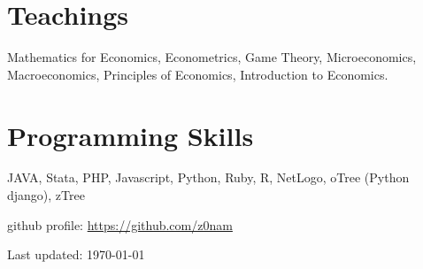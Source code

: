 \documentclass[11pt, a4paper]{article} %
\newcommand{\years}[1]{\marginnote{\scriptsize #1}} %
\begin{document}

\section*{Teachings}

\years{2007-} Mathematics for Economics, Econometrics, Game Theory, Microeconomics, Macroeconomics, Principles of Economics, Introduction to Economics.



%

\section*{Programming Skills}

JAVA, Stata, PHP, Javascript, Python, Ruby, R, NetLogo, oTree (Python django), zTree

github profile: \url{https://github.com/z0nam}

\vfill{} %


\begin{center}
{\scriptsize Last updated: \today%
} %
\end{center}

\end{document}

